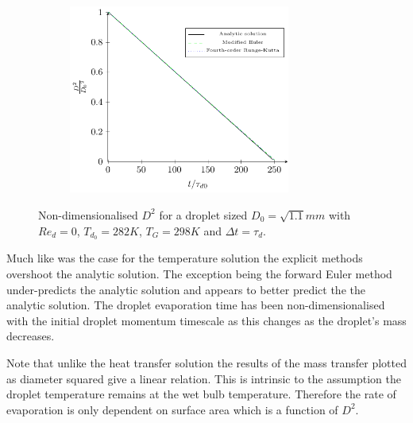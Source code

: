 \documentclass[../Interim_Report_Master]{subfiles}
\begin{document}
\begin{figure}\ContinuedFloat
	\centering
	\begin{subfigure}{\textwidth}
		\centering
		\includegraphics[width=0.8\textwidth]{./Diagrams/Uncoupled_D2_Transfer_tau/Uncoupled_D2_Transfer_2_tau.pdf}
		\caption{}
		\label{diameter_squared_time_2_tau}
	\end{subfigure}
	\caption{Non-dimensionalised $D^2$ for a droplet sized $D_0=\sqrt{1.1}mm$ with $Re_d=0$, $T_{d_0}=282K$, $T_G=298K$ and $\Delta t=\tau_d$.}
\end{figure}

Much like was the case for the temperature solution the explicit methods overshoot the analytic solution. The exception being the forward Euler method under-predicts the analytic solution and appears to better predict the the analytic solution. The droplet evaporation time has been non-dimensionalised with the initial droplet momentum timescale as this changes as the droplet's mass decreases.

Note that unlike the heat transfer solution the results of the mass transfer plotted as diameter squared give a linear relation. This is intrinsic to the assumption the droplet temperature remains at the wet bulb temperature. Therefore the rate of evaporation is only dependent on surface area which is a function of $D^2$.
\end{document}
